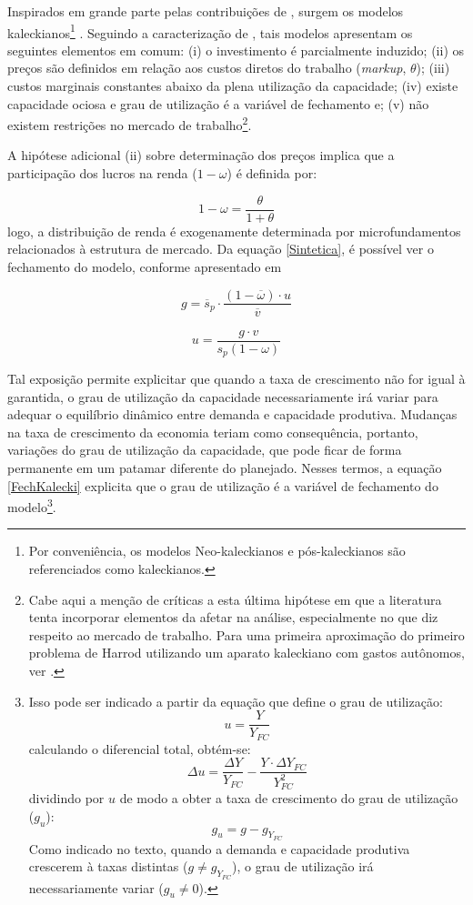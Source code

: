 Inspirados em grande parte pelas contribuições de \textcite{steindl_stagnation_1979}, surgem os modelos kaleckianos\footnote{Por conveniência, os modelos Neo-kaleckianos e pós-kaleckianos são referenciados como kaleckianos.} \cites{rowthorn_demand_1981}{dutt_stagnation_1984}{taylor_stagnationist_1985}{amadeo_role_1986}{bhaduri_unemployment_1990}. Seguindo a caracterização de \textcite[p.~790]{lavoie_kaleckian_1995}, tais modelos apresentam os seguintes elementos em comum: (i) o investimento é parcialmente induzido; (ii) os preços são definidos em relação aos custos diretos do trabalho (\textit{markup}, $\theta$); (iii) custos marginais constantes abaixo da plena utilização da capacidade; (iv) existe capacidade ociosa e grau de utilização é a variável de fechamento e; (v) não existem restrições no mercado de trabalho\footnote{Cabe aqui a menção de críticas a esta última hipótese em que a literatura tenta incorporar elementos da afetar na análise, especialmente no que diz respeito ao mercado de trabalho. Para uma primeira aproximação do primeiro problema de Harrod utilizando um aparato kaleckiano com gastos autônomos, ver \textcite{allain_demographic_2018}.}. 

A hipótese adicional (ii) sobre determinação dos preços implica que a participação dos lucros na renda ($1-\omega$) é definida por:

$$
1- \omega = \frac{\theta}{1+\theta}
$$
logo, a distribuição de renda é exogenamente determinada por microfundamentos relacionados à estrutura de mercado. 
Da equação \ref{Sintetica}, é possível ver o fechamento do modelo, conforme apresentado em \textcite{serrano_trouble_2017}

$$
g = \overline s_p\cdot \frac{(1-\overline\omega)\cdot u}{\overline v}
$$

\begin{equation}
\label{FechKalecki}
u = \frac{g\cdot v}{s_p(1-\omega)}
\end{equation}

Tal exposição permite explicitar que quando a taxa de crescimento não for igual à garantida, o grau de utilização da capacidade necessariamente irá variar para adequar o equilíbrio dinâmico entre demanda e capacidade produtiva.
Mudanças na taxa de crescimento da economia teriam como consequência, portanto, variações do grau de utilização da capacidade, que pode ficar de forma permanente em um patamar diferente do planejado.
Nesses termos, a equação \ref{FechKalecki} explicita que o grau de utilização é a variável de fechamento do modelo\footnote{Isso pode ser indicado a partir da equação que define o grau de utilização:
$$
u = \frac{Y}{Y_{FC}}
$$
calculando o diferencial total, obtém-se:
$$
\Delta u = \frac{\Delta Y}{ Y_{FC}} - \frac{Y\cdot \Delta Y_{FC}}{Y_{FC}^2}
$$
dividindo por $u$ de modo a obter a taxa de crescimento do grau de utilização ($g_u$):
$$
g_u = g - g_{Y_{FC}}
$$
Como indicado no texto, quando a demanda e capacidade produtiva crescerem à taxas distintas ($g \neq g_{Y_{FC}}$), o grau de utilização irá necessariamente variar ($g_u \neq 0$).
}.

